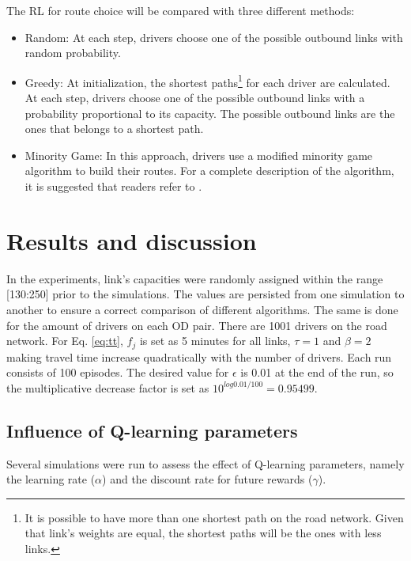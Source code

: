 \documentclass{RITA}
\newcommand{\fftt}{\ensuremath{f_j}} 		%
\begin{document}
The RL for route choice will be compared with three different methods:

\begin{itemize}
  \item Random: At each step, drivers choose one of the possible outbound links with random probability.
  \item Greedy: At initialization, the shortest paths\footnote{It is possible to have more than one shortest path on the road network. Given that link's weights are equal, the shortest paths will be the ones with less links.} for each driver are calculated. At each step, drivers choose one of the possible outbound links with a probability proportional to its capacity. The possible outbound links are the ones that belongs to a shortest path. %
  \item Minority Game: In this approach, drivers use a modified minority game algorithm to build their routes. For a complete description of the algorithm, it is suggested that readers refer to \cite{Galib&Moser2011}.
\end{itemize}

\section{Results and discussion}
\label{sec:results}

In the experiments, link's capacities were randomly assigned within the range [130:250] prior to the simulations. The values are persisted from one simulation to another to ensure a correct comparison of different algorithms. The same is done for the amount of drivers on each OD pair. There are 1001 drivers on the road network. For Eq. \eqref{eq:tt}, $\fftt$ is set as 5 minutes for all links, $\tau = 1$ and $\beta = 2$ making travel time increase quadratically with the number of drivers. Each run consists of 100 episodes. The desired value for $\epsilon$ is 0.01 at the end of the run, so the multiplicative decrease factor is set as $10^{log 0.01 / 100} = 0.95499$.

\subsection{Influence of Q-learning parameters}

Several simulations were run to assess the effect of Q-learning parameters, namely the learning rate ($\alpha$) and the discount rate for future rewards ($\gamma$).
\end{document}
